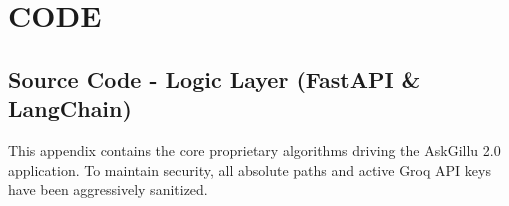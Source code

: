 \documentclass[12pt,a4paper]{report}
\begin{document}
\appendix

\chapter*{CODE}

\section{Source Code - Logic Layer (FastAPI \& LangChain)}
This appendix contains the core proprietary algorithms driving the AskGillu 2.0 application. To maintain security, all absolute paths and active Groq API keys have been aggressively sanitized.
\end{document}
